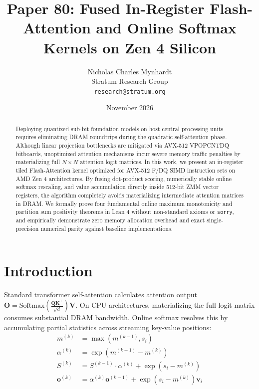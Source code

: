 \documentclass[10pt,twocolumn,letterpaper]{article}
\title{Paper 80: Fused In-Register Flash-Attention and Online Softmax Kernels on Zen 4 Silicon}
\author{Nicholas Charles Mynhardt \\ Stratum Research Group \\ \texttt{research@stratum.org}}
\date{November 2026}
\begin{document}
\maketitle

\begin{abstract}
Deploying quantized sub-bit foundation models on host central processing units requires eliminating DRAM roundtrips during the quadratic self-attention phase. Although linear projection bottlenecks are mitigated via AVX-512 VPOPCNTDQ bitboards, unoptimized attention mechanisms incur severe memory traffic penalties by materializing full $N \times N$ attention logit matrices. In this work, we present an in-register tiled Flash-Attention kernel optimized for AVX-512 F/DQ SIMD instruction sets on AMD Zen 4 architectures. By fusing dot-product scoring, numerically stable online softmax rescaling, and value accumulation directly inside 512-bit ZMM vector registers, the algorithm completely avoids materializing intermediate attention matrices in DRAM. We formally prove four fundamental online maximum monotonicity and partition sum positivity theorems in Lean 4 without non-standard axioms or \texttt{sorry}, and empirically demonstrate zero memory allocation overhead and exact single-precision numerical parity against baseline implementations.
\end{abstract}

\section{Introduction}
Standard transformer self-attention calculates attention output $\mathbf{O} = \text{Softmax}\left(\frac{\mathbf{Q}\mathbf{K}^\top}{\sqrt{d}}\right)\mathbf{V}$. On CPU architectures, materializing the full logit matrix consumes substantial DRAM bandwidth. Online softmax resolves this by accumulating partial statistics across streaming key-value positions:
\begin{align}
m^{(k)} &= \max\left(m^{(k-1)}, s_i\right) \\
\alpha^{(k)} &= \exp\left(m^{(k-1)} - m^{(k)}\right) \\
S^{(k)} &= S^{(k-1)} \cdot \alpha^{(k)} + \exp\left(s_i - m^{(k)}\right) \\
\mathbf{o}^{(k)} &= \alpha^{(k)} \mathbf{o}^{(k-1)} + \exp\left(s_i - m^{(k)}\right) \mathbf{v}_i
\end{align}
\end{document}
